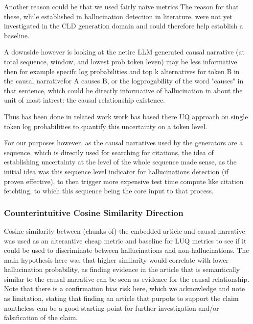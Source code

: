Another reason could be that we used fairly naive metrics The reason for that these, while established in hallucination detection in literature, were not yet investigated in the CLD generation domain and could therefore help establish a baseline.

A downside however is looking at the netire LLM generated causal narrative (at total sequence, window, and lowest prob token leven) may be less informative then for example specifc log probabilities and top k alternatives for token B in the causal narrativefor A causes B, or the logprogability of the word "causes" in that sentence, which could be directly informative of hallucination in about the unit of most intrest: the causal relationship existence.

Thus has been done in related work work \cite{Waaijers2024theoraizer} has based there UQ approach on single token log probabilities to quantify this uncertainty on a token level.

For our purposes however, as the causal narratives used by the generators are a sequence, which is directly used for searching for citations, the idea of establishing uncertainty at the level of the whole sequence made sense, as the initial idea was this sequence level indicator for hallucinations detection (if proven effective), to then trigger more expensive test time compute like citation fetchting, to which this sequence being the core input to that process.




\subsubsection{Counterintuitive Cosine Similarity Direction}

Cosine similarity between (chunks of) the embedded article and causal narrative was used as an alterantive cheap metric and baseline for LUQ metrics to see if it could be used to discriminate between hallucinations and non-hallucinations.
The main hypothesis here was that higher similarity would correlate with lower hallucination probability, as finding evidence in the article that is semantically similar to the causal narrative can be seen as evidence for the causal relationship. Note that there is a confirmation bias risk here, which we acknowledge and note as limitation, stating that finding an article that purpots to support the claim nontheless can be a good starting point for further investigation and/or falsification of the claim.

